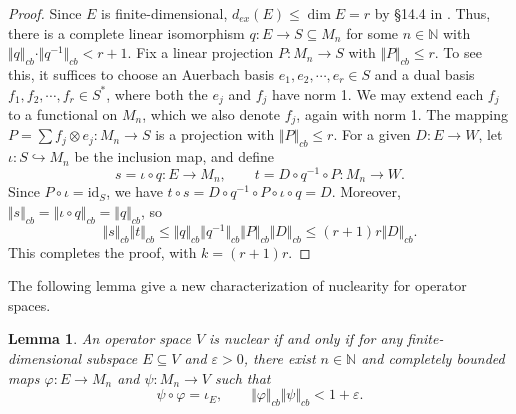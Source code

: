 \documentclass[12pt]{article}
\newtheorem{lemma}[theorem]{Lemma}
\theoremstyle{definition}
\theoremstyle{remark}
\begin{document}
\begin{proof}
Since $E$ is finite-dimensional, $d_{ex}(E)\leq \dim E=r$ by \S 14.4 in
\cite{ER00}. Thus, there is a complete linear isomorphism $q: E\to S\subseteq M_{n}$ for some $n\in\mathbb{N}$ with $\Vert q\Vert_{cb}\cdot\Vert q^{-1}\Vert_{cb}<r+1$.
Fix a linear projection $P:M_n\to S$ with $\Vert P\Vert_{cb}\leq r$. To see this, it suffices to choose an Auerbach basis $e_{1}, e_{2}, \cdots, e_{r}\in S $ and a dual basis $f_{1}, f_{2}, \cdots, f_{r}\in S^{*}$, where both the $e_{j}$ and $f_{j}$ have norm 1. We may extend each $f_{j}$ to a functional on $M_n$, which we also denote $f_{j}$, again with norm 1. The mapping $P=\sum f_{j}\otimes e_{j}: M_n\to S$ is a projection with $\Vert P\Vert_{cb}\leq r$.
For a given $D:E\to W$, let $\iota:S\hookrightarrow M_n$ be the inclusion map, and define
\[
s=\iota\circ q:E\to M_n,\qquad t=D\circ q^{-1}\circ P:M_n\to W.
\]
Since $P\circ\iota=\mathrm{id}_S$, we have $t\circ s=D\circ q^{-1}\circ P\circ\iota\circ q=D$.
Moreover, $\Vert s\Vert_{cb}=\Vert\iota\circ q\Vert_{cb}=\Vert q\Vert_{cb}$, so
\[
\Vert s\Vert_{cb}\Vert t\Vert_{cb}
\le \Vert q\Vert_{cb}\Vert q^{-1}\Vert_{cb}\Vert P\Vert_{cb}
   \Vert D\Vert_{cb}\leq (r+1)r\Vert D\Vert_{cb}.
\]
This completes the proof, with $k=(r+1)r$.
\end{proof}

The following lemma give a new characterization of nuclearity for operator spaces.
\begin{lemma}\label{lem:nuclear-exact-local}
An operator space $V$ is nuclear if and only if for any
finite-dimensional subspace $E\subseteq V$ and $\varepsilon>0$,
there exist $n\in\mathbb N$ and completely bounded maps
$\varphi:E\to M_n$ and $\psi:M_n\to V$ such that
\[
\psi\circ\varphi=\iota_E,\qquad
\Vert\varphi\Vert_{cb}\Vert\psi\Vert_{cb}<1+\varepsilon.
\]
\end{lemma}
\end{document}

